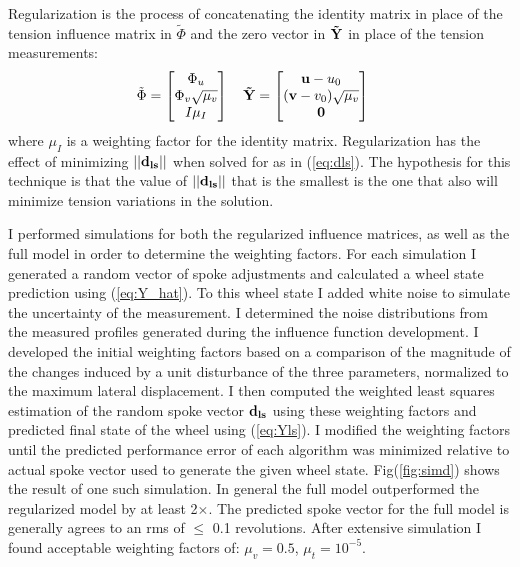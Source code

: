 \documentclass[journal]{IEEEtran}
\begin{document}
Regularization is the process of concatenating the identity matrix in place of the tension influence matrix in $\tilde \Phi$ and the zero vector in $\bf \tilde Y$ in place of the tension measurements:
\begin{align}
    \tilde \Phi &= \begin{bmatrix}
    \Phi_u\\
    \Phi_v \sqrt {\mu_v}\\
   I \mu_I
    \end{bmatrix} \quad
    \bf \tilde Y = \begin{bmatrix}
    \mathbf {u} - u_0 \\
   (\mathbf {v}- v_0)  \sqrt {\mu_v}\\
   \bf 0
    \end{bmatrix} 
    \label{eq:y_tilde2}
\end{align}
where $\mu_I$ is a weighting factor for the identity matrix. Regularization has the effect of minimizing $||\bf d_{ls}||$ when solved for as in (\ref{eq:dls}). The hypothesis for this technique is that the value of $||\bf d_{ls}||$ that is the smallest is the one that also will minimize tension variations in the solution. 

I performed simulations for both the regularized influence matrices, as well as the full model in order to determine the weighting factors. For each simulation I generated a random vector of spoke adjustments and calculated a wheel state prediction using (\ref{eq:Y_hat}). To this wheel state I added white noise to simulate the uncertainty of the measurement.  I determined the noise distributions from the measured profiles generated during the influence function development.  I developed the initial weighting factors based on a comparison of the magnitude of the changes induced by a unit disturbance of the three parameters, normalized to the maximum lateral displacement. I then computed the weighted least squares estimation of the random spoke vector $\bf d_{ls}$ using these weighting factors and  predicted final state of the wheel using (\ref{eq:Yls}). I modified the weighting factors until the predicted performance error of each algorithm was minimized relative to actual spoke vector used to generate the given wheel state. Fig(\ref{fig:simd}) shows the result of one such simulation. In general the full model outperformed the regularized model by at least 2$\times$. The predicted spoke vector for the full model is generally agrees to an rms of $\leq$ 0.1 revolutions.  After extensive simulation I found acceptable weighting factors of: $\mu_v = 0.5$, $ \mu_t =10^{-5}$.
\end{document}
